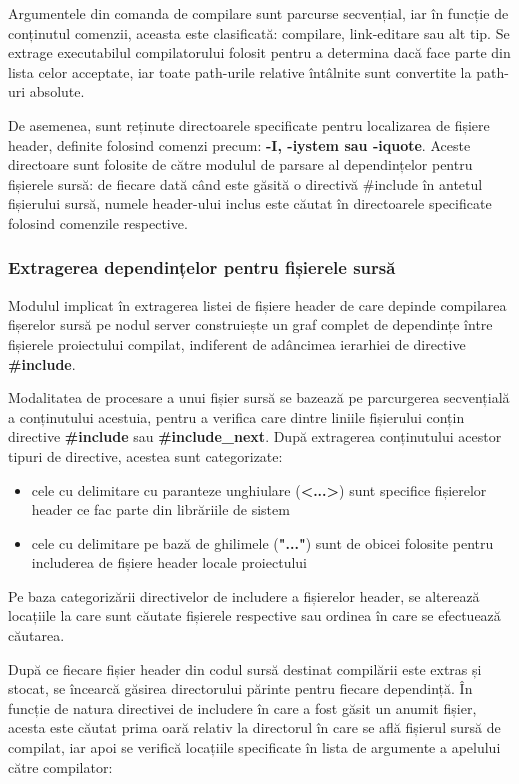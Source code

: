 Argumentele din comanda de compilare sunt parcurse secvențial, iar în funcție de conținutul comenzii, aceasta este clasificată: compilare, link-editare sau alt tip. Se extrage executabilul
compilatorului folosit pentru a determina dacă face parte din lista celor acceptate, iar toate path-urile relative întâlnite sunt convertite la path-uri absolute.

De asemenea, sunt reținute directoarele specificate pentru localizarea de fișiere header, definite folosind comenzi precum: \textbf{-I, -iystem sau -iquote}.
Aceste directoare sunt folosite de către modulul de parsare al dependințelor pentru fișierele sursă: de fiecare dată când este găsită
o directivă \#include în antetul fișierului sursă, numele header-ului inclus este căutat în directoarele specificate folosind comenzile respective.

\subsubsection{Extragerea dependințelor pentru fișierele sursă}

Modulul implicat în extragerea listei de fișiere header de care depinde compilarea fișerelor sursă pe nodul server construiește un graf complet de dependințe
între fișierele proiectului compilat, indiferent de adâncimea ierarhiei de directive \textbf{\#include}.

Modalitatea de procesare a unui fișier sursă se bazează pe parcurgerea secvențială a conținutului acestuia, pentru a verifica care dintre liniile fișierului
conțin directive \textbf{\#include} sau \textbf{\#include\_next}. După extragerea conținutului acestor tipuri de directive, acestea sunt categorizate:

\begin{itemize}
    \item cele cu delimitare cu paranteze unghiulare (\textbf{<...>}) sunt specifice fișierelor header ce fac parte din librăriile de sistem
    \item cele cu delimitare pe bază de ghilimele (\textbf{"..."}) sunt de obicei folosite pentru includerea de fișiere header locale proiectului
\end{itemize}

Pe baza categorizării directivelor de includere a fișierelor header, se alterează locațiile la care sunt căutate fișierele respective sau ordinea în care se efectuează
căutarea.

După ce fiecare fișier header din codul sursă destinat compilării este extras și stocat, se încearcă găsirea directorului părinte pentru fiecare dependință.
În funcție de natura directivei de includere în care a fost găsit un anumit fișier, acesta este căutat prima oară relativ la directorul în care se află fișierul
sursă de compilat, iar apoi se verifică locațiile specificate în lista de argumente a apelului către compilator:

